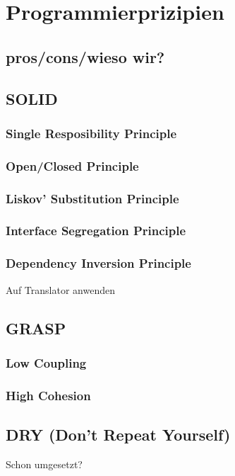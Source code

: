 \documentclass{article}
\begin{document}
\begin{figure}
	\begin{center}
	\end{center}
\end{figure}

\section{Programmierprizipien}
\subsection{pros/cons/wieso wir?}
\subsection{SOLID}
\subsubsection{Single Resposibility Principle}
\subsubsection{Open/Closed Principle}
\subsubsection{Liskov' Substitution Principle}
\subsubsection{Interface Segregation Principle}
\subsubsection{Dependency Inversion Principle}
Auf Translator anwenden
\subsection{GRASP}
\subsubsection{Low Coupling}
\subsubsection{High Cohesion}
\subsection{DRY (Don't Repeat Yourself)}
Schon umgesetzt?
\end{document}
